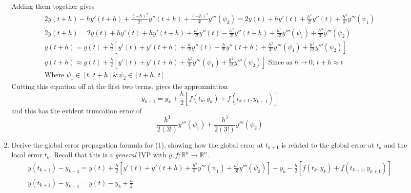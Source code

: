\documentclass{article}
\begin{document}
\begin{enumerate}
\begin{enumerate}
               Adding them together gives 
               \begin{align*}
               2y(t + h) - hy'(t + h) 
               + \frac{(-h)^2}{2!} y''(t+h) 
               + \frac{(-h)^3}{3!}y'''(\psi_2)
               = 2y(t) + hy'(t) + \frac{h^2}{2!} y''(t) 
               + \frac{h^3}{3!}y'''(\psi_1) \\
               2y(t + h) 
               = 2y(t) + hy'(t) + hy'(t + h) + \frac{h^2}{2!} y''(t) 
               - \frac{h^2}{2!} y''(t+h) 
               + \frac{h^3}{3!}y'''(\psi_1) 
               + \frac{h^3}{3!}y'''(\psi_2) \\
               y(t + h) 
               = y(t) + \frac{h}{2}
               [y'(t) + y'(t + h) + \frac{h}{2!} y''(t) 
               - \frac{h}{2!} y''(t+h) 
               + \frac{h^2}{3!}y'''(\psi_1) 
               + \frac{h^2}{3!}y'''(\psi_2)] \\
               y(t + h) \approx y(t) + \frac{h}{2}
               [y'(t) + y'(t + h) 
               + \frac{h^2}{3!}y'''(\psi_1) 
               + \frac{h^2}{3!}y'''(\psi_2)] \text{ Since as }
               h \rightarrow 0,\, t + h \approx t\\
               \text{Where } \psi_1 \in [t,\, t+h] \& \,
               \psi_2 \in [t+h ,\, t] 
               \end{align*}
               Cutting this equation off at the first two terms, gives
               the approxmiation
               \[ y_{k+1}
               = y_k + \frac{h}{2}
               [f(t_k, y_k) + f(t_{k+1}, y_{k+1})] \]
               and this has the evident truncation error of 
               \[\frac{h^3}{2(3!)}y'''(\psi_1) 
               + \frac{h^3}{2(3!)}y'''(\psi_2)\]
            \item Derive the global error propagation formula for (1),
                showing how the global error at $t_{k+1}$ is related
                to the global error at $t_k$ and the local error $t_k$.
                Recall that this is a \textit{general} IVP with $y,f:
                \mathbb{R}^n \rightarrow \mathbb{R}^n$.
                \begin{align*} y(t_{k+1}) - y_{k+1} = 
               y(t) + \frac{h}{2}
               [y'(t) + y'(t + h) 
               + \frac{h^2}{3!}y'''(\psi_1) 
               + \frac{h^2}{3!}y'''(\psi_2)]
               - y_k - \frac{h}{2}[f(t_k, y_k) + f(t_{k+1}, y_{k+1})] \\
               y(t_{k+1}) - y_{k+1} = 
               y(t) - y_k + \frac{h}{2}

\end{align*}
\end{enumerate}
\end{enumerate}
\end{document}

